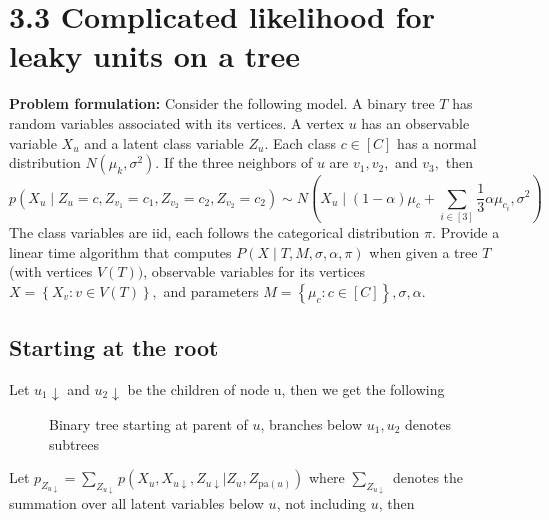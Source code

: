 \section*{3.3 Complicated likelihood for leaky units on a tree}
\begin{tcolorbox}
  \textbf{Problem formulation:} Consider the following model. A binary tree $T$ has random variables associated with its vertices. A vertex $u$ has an observable variable $X_{u}$ and a latent class variable $Z_{u} .$ Each class $c \in[C]$ has a normal distribution $N\left(\mu_{k}, \sigma^{2}\right) .$ If the three neighbors of $u$ are $v_{1}, v_{2},$ and $v_{3},$ then
  $$
  p\left(X_{u} \mid Z_{u}=c, Z_{v_{1}}=c_{1}, Z_{v_{2}}=c_{2}, Z_{v_{2}}=c_{2}\right) \sim N\left(X_{u} \mid(1-\alpha) \mu_{c}+\sum_{i \in[3]} \frac{1}{3} \alpha \mu_{c_{i}}, \sigma^{2}\right)
  $$
  The class variables are iid, each follows the categorical distribution $\pi .$ Provide a linear time algorithm that computes $P(X \mid T, M, \sigma, \alpha, \pi)$ when given a tree $T$ (with vertices $V(T))$, observable variables for its vertices $X=\left\{X_{v}: v \in V(T)\right\},$ and parameters $M=\left\{\mu_{c}: c \in[C]\right\}, \sigma, \alpha .$
\end{tcolorbox}

\subsection{Starting at the root}



Let $u_{1}\downarrow$ and $u_{2}\downarrow$ be the children of node u, then we get the following


\begin{figure}[H]
\begin{center}
\end{center}
  \caption{Binary tree starting at parent of $u$, branches below $u_1, u_2$ denotes subtrees}
\end{figure}
Let $p_{Z_{u \downarrow}} = \sum_{Z_{u \downarrow}} p(X_u, X_{u \downarrow}, Z_{u \downarrow}|Z_u, Z_{\text{pa}(u)})$ where $\sum_{Z_{u \downarrow}}$ denotes the summation over all latent variables below $u$, not including $u$, then

